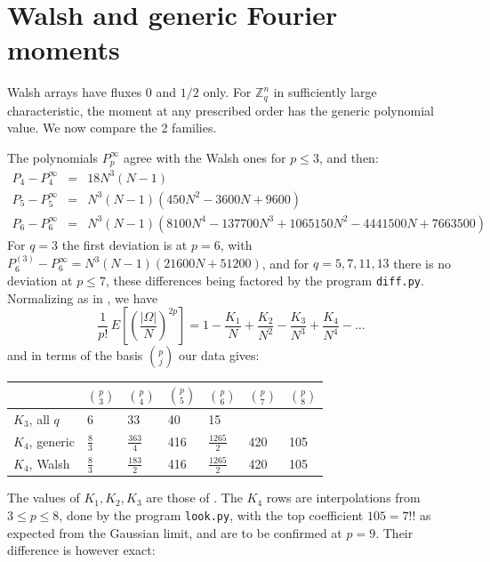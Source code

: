 \documentclass[11pt,a4paper]{article}
\theoremstyle{remark}
\begin{document}
\section{Walsh and generic Fourier moments}\label{sec:walsh}

Walsh arrays have fluxes 0 and $1/2$ only. For $\mathbb Z_q^n$ in sufficiently large characteristic, the moment at any prescribed order has the generic polynomial value. We now compare the 2 families.

The polynomials $P^\infty_p$ agree with the Walsh ones for $p\leq3$, and then:
\begin{eqnarray*}
P_4-P^\infty_4&=&18N^3(N-1)\\
P_5-P^\infty_5&=&N^3(N-1)(450N^2-3600N+9600)\\
P_6-P^\infty_6&=&N^3(N-1)(8100N^4-137700N^3+1065150N^2-4441500N+7663500)
\end{eqnarray*}
For $q=3$ the first deviation is at $p=6$, with $P^{(3)}_6-P^\infty_6=N^3(N-1)(21600N+51200)$, and for $q=5,7,11,13$ there is no deviation at $p\leq7$, these differences being factored by the program \texttt{diff.py}. Normalizing as in \cite{banica}, we have
$$\frac{1}{p!}\,E\left[\left(\frac{|\Omega|}{N}\right)^{2p}\right]=1-\frac{K_1}{N}+\frac{K_2}{N^2}-\frac{K_3}{N^3}+\frac{K_4}{N^4}-\ldots$$
and in terms of the basis $\binom{p}{j}$ our data gives:

\medskip

\begin{center}
\begin{tabular}{lllllll}
\toprule
& $\binom{p}{3}$ & $\binom{p}{4}$ & $\binom{p}{5}$ & $\binom{p}{6}$ & $\binom{p}{7}$ & $\binom{p}{8}$\\
\midrule
$K_3$, all $q$ & 6 & 33 & 40 & 15 & & \\
$K_4$, generic & $\frac{8}{3}$ & $\frac{363}{4}$ & 416 & $\frac{1265}{2}$ & 420 & 105\\
$K_4$, Walsh & $\frac{8}{3}$ & $\frac{183}{2}$ & 416 & $\frac{1265}{2}$ & 420 & 105\\
\bottomrule
\end{tabular}
\end{center}

\medskip

\noindent The values of $K_1,K_2,K_3$ are those of \cite[Theorem 3.6]{banica}. The $K_4$ rows are interpolations from $3\leq p\leq8$, done by the program \texttt{look.py}, with the top coefficient $105=7!!$ as expected from the Gaussian limit, and are to be confirmed at $p=9$. Their difference is however exact:
\end{document}
